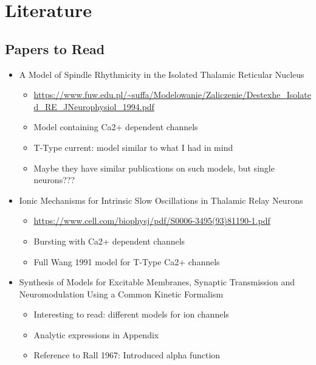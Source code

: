 \documentclass[../workflow.tex]{subfiles}
\begin{document}
\section{Literature}
\etocignoretoctocdepth %
\etocsettocstyle{\subsection*{\contentsname}}{}
\localtableofcontents

\subsection{Papers to Read}
\begin{itemize}
   
    
    \item A Model of Spindle Rhythmicity in the Isolated Thalamic Reticular Nucleus
    \begin{itemize}
        \item \url{https://www.fuw.edu.pl/~suffa/Modelowanie/Zaliczenie/Destexhe_Isolated_RE_JNeurophysiol_1994.pdf}
        \item Model containing Ca2+ dependent channels
        \item T-Type current: model similar to what I had in mind
        \item Maybe they have similar publications on such models, but single neurons???
    \end{itemize}

    \item Ionic Mechanisms for Intrinsic Slow Oscillations in Thalamic Relay Neurons
    \begin{itemize}
        \item \url{https://www.cell.com/biophysj/pdf/S0006-3495(93)81190-1.pdf}
        \item Bursting with Ca2+ dependent channels
        \item Full Wang 1991 model for T-Type Ca2+ channels
    \end{itemize}

    \item Synthesis of Models for Excitable Membranes, Synaptic Transmission and Neuromodulation Using a Common Kinetic Formalism
    \begin{itemize}
        \item Interesting to read: different models for ion channels
        \item Analytic expressions in Appendix
        \item Reference to Rall 1967: Introduced alpha function
    \end{itemize}


\end{itemize}
\end{document}
